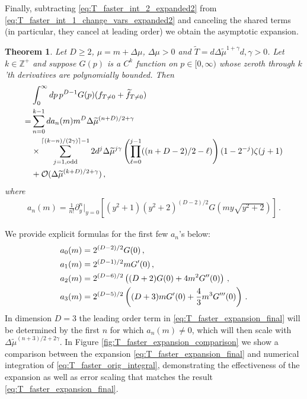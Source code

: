 \documentclass[sn-mathphys,Numbered]{sn-jnl}
\newtheorem{theorem}{Theorem}
\begin{document}
Finally, subtracting \eqref{eq:T_faster_int_2_expanded2} from \eqref{eq:T_faster_int_1_change_vars_expanded2} and canceling the shared terms (in particular, they cancel at leading order) we  obtain the asymptotic expansion.
\begin{theorem}\label{thms:T_decay_faster}
Let $D\geq 2$,     $\mu=m+\Delta\mu$, $\Delta\mu>0$ and $\widetilde{T}=d\Delta\widetilde{\mu}^{1+\gamma}$$d,\gamma>0$.  Let $k\in\mathbb{Z}^+$ and suppose $G(p)$ is a $C^k$ function on $p\in[0,\infty)$ whose zeroth through $k$'th derivatives are polynomially bounded. Then
\begin{align}
    &\int_0^\infty dp\, p^{D-1} G(p)(f_{T\neq 0}+\widetilde{f}_{T\neq 0})\label{eq:T_faster_orig_integral}\\
    =& \sum_{n=0}^{k-1} da_n(m)m^{D}\Delta\widetilde{\mu}^{(n+D)/2+\gamma}\label{eq:T_faster_expansion_final}\\
    &\times\sum_{j=1,\mathrm{odd}}^{\lceil(k-n)/(2\gamma)\rceil-1}
 2d^j\Delta\widetilde{\mu}^{j\gamma}\left(\prod_{\ell=0}^{j-1}((n+D-2)/2-\ell) \right)(1-2^{-j})\zeta(j+1) \notag\\
    &+\mathcal{O}(\Delta\widetilde{\mu}^{(k+D)/2+\gamma})\,,\notag
\end{align} 
where
\begin{align}\label{eq:an_def}
a_n(m)=\frac{1}{n!}\partial_y^n|_{y=0}\left[  (y^2+1)(  y^2+2)^{(D-2)/2} G\left(my\sqrt{y^2+2}\right)\right]\,.
\end{align}
\end{theorem}
We provide explicit formulas for the first few  $a_n$'s below:
\begin{align}\label{eq:first_few_a_ns}
  &a_0(m)=2^{(D-2)/2} G(0)\,,\\
  &a_1(m)=2^{(D-1)/2}mG^\prime(0)\,,\notag\\
  &a_2(m)=2^{(D-6)/2}\left((D+2)G(0)+4m^2 G^{\prime\prime}(0)\right)\,,\notag\\
  &a_3(m)=2^{(D - 5)/2} \left((D + 3) m G^\prime(0) +  \frac{4}{3}m^3 G^{\prime\prime\prime}(0) \right)\,.\notag
\end{align}
In dimension $D=3$ the leading order term in \eqref{eq:T_faster_expansion_final} will be determined by the first $n$ for which $a_n(m)\neq 0$, which will then scale with $\Delta\widetilde{\mu}^{(n+3)/2+2\gamma}$.  In Figure \ref{fig:T_faster_expansion_comparison} we show a comparison between the expansion \eqref{eq:T_faster_expansion_final} and numerical integration of \eqref{eq:T_faster_orig_integral}, demonstrating the effectiveness of the expansion as well as error scaling that matches the result \eqref{eq:T_faster_expansion_final}.
\end{document}
